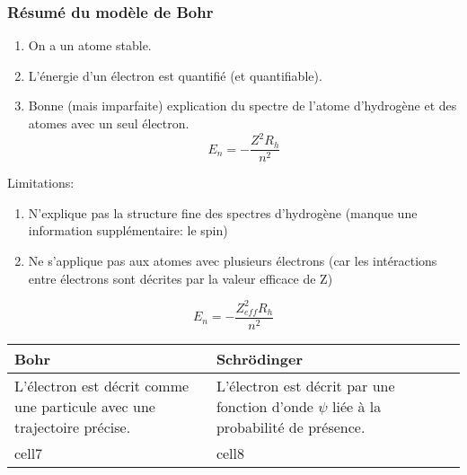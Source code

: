 \documentclass[10pt,a4paper]{book}
\begin{document}
\subsubsection{Résumé du modèle de Bohr}
\begin{enumerate}
\item On a un atome stable.
\item L'énergie d'un électron est quantifié (et quantifiable).
\item Bonne (mais imparfaite) explication du spectre de l’atome d’hydrogène et des atomes avec un seul électron.
\begin{displaymath}
E_n = -\frac{{Z^2}{R_h}}{n^2}
\end{displaymath}
\end{enumerate}
Limitations:
\begin{enumerate}
\item N'explique pas la structure fine des spectres d'hydrogène (manque une information supplémentaire: le spin)
\item Ne s'applique pas aux atomes avec plusieurs électrons (car les intéractions entre électrons sont décrites par la valeur efficace de Z)
\end{enumerate}
\begin{displaymath}
E_n = -\frac{{Z_{eff}^2}{R_h}}{n^2}
\end{displaymath}
\begin{center}
\begin{tabular}{ | m{5cm} | m{5cm}| m{5cm} | } 
  \hline
  Bohr & Schrödinger \\ 
  \hline
  L’électron est décrit comme une particule avec une trajectoire précise. & L'électron est décrit par une fonction d’onde $\psi$ liée à la probabilité de présence. \\ 
  \hline
  cell7 & cell8 \\ 
  \hline
\end{tabular}
\end{center}
\end{document}
